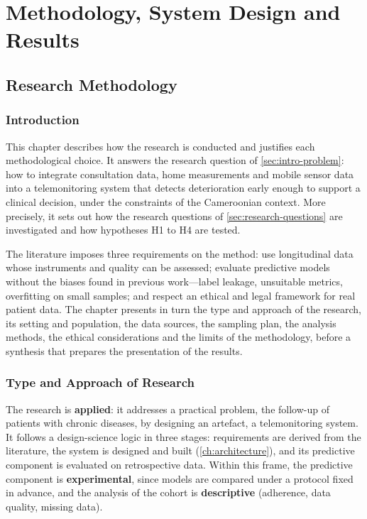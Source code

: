 \part{Methodology, System Design and Results}

\chapter{Research Methodology}\label{ch:methodology}\label{ch:data}

\section{Introduction}\label{sec:meth-intro}

This chapter describes how the research is conducted and justifies each methodological choice. It answers the research question of \cref{sec:intro-problem}: how to integrate consultation data, home measurements and mobile sensor data into a telemonitoring system that detects deterioration early enough to support a clinical decision, under the constraints of the Cameroonian context. More precisely, it sets out how the research questions of \cref{sec:research-questions} are investigated and how hypotheses H1 to H4 are tested.

The literature imposes three requirements on the method: use longitudinal data whose instruments and quality can be assessed; evaluate predictive models without the biases found in previous work---label leakage, unsuitable metrics, overfitting on small samples; and respect an ethical and legal framework for real patient data. The chapter presents in turn the type and approach of the research, its setting and population, the data sources, the sampling plan, the analysis methods, the ethical considerations and the limits of the methodology, before a synthesis that prepares the presentation of the results.

\section{Type and Approach of Research}\label{sec:research-type}

The research is \textbf{applied}: it addresses a practical problem, the follow-up of patients with chronic diseases, by designing an artefact, a telemonitoring system. It follows a design-science logic in three stages: requirements are derived from the literature, the system is designed and built (\cref{ch:architecture}), and its predictive component is evaluated on retrospective data. Within this frame, the predictive component is \textbf{experimental}, since models are compared under a protocol fixed in advance, and the analysis of the cohort is \textbf{descriptive} (adherence, data quality, missing data).

